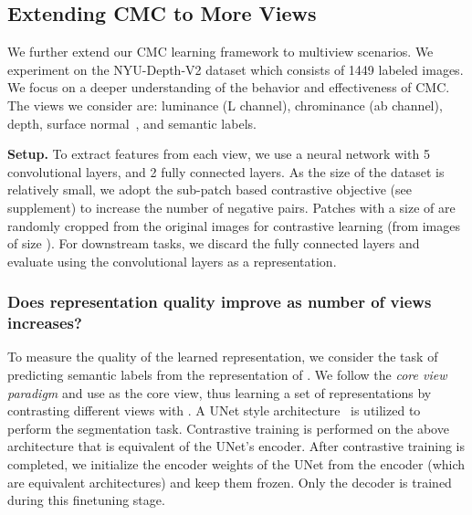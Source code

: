 \documentclass[10pt,twocolumn,letterpaper]{article}
\newcommand{\header}[1]{\vspace{0.05in}\noindent\textbf{#1}}
\newcommand{\citep}[1]{\cite{#1}}
\begin{document}
 \subsection{Extending CMC to More Views}
We further extend our CMC learning framework to multiview scenarios. We experiment on the NYU-Depth-V2 \citep{Silberman:ECCV12} dataset which consists of 1449 labeled images. We focus on a deeper understanding of the behavior and effectiveness of CMC. The views we consider are: luminance (L channel), chrominance (ab channel), depth, surface normal~\citep{eigen2015predicting}, and semantic labels.

\header{Setup.} To extract features from each view, we use a  neural network with 5 convolutional layers, and 2 fully connected layers. As the size of the dataset is relatively small, we adopt the sub-patch based contrastive objective (see supplement) to increase the number of negative pairs. Patches with a size of  are randomly cropped from the original images for contrastive learning (from images of size ). For downstream tasks, we discard the fully connected layers and evaluate using the convolutional layers as a representation. 

\subsubsection{Does representation quality improve as number of views increases?}

To measure the quality of the learned representation, we consider the task of predicting semantic labels from the representation of . We follow the \emph{core view paradigm} and use  as the core view, thus learning a set of representations by contrasting different views with .
A UNet style architecture~\citep{ronneberger2015u} is utilized to perform the segmentation task. Contrastive training is performed on the above architecture that is equivalent of the UNet's encoder. After contrastive training is completed, we initialize the encoder weights of the UNet from the  encoder (which are equivalent architectures) and keep them frozen. Only the decoder is trained during this finetuning stage. 
\end{document}
